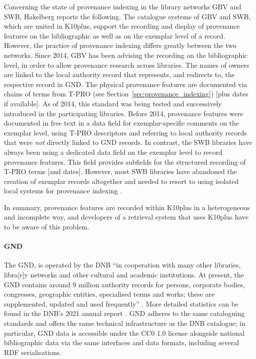 Concerning the state of provenance indexing in the library networks \gls{GBV} and \gls{SWB},
Hakelberg \autocite*[§4]{Hakelberg2016} reports the following.
The catalogue systems of \gls{GBV} and \gls{SWB}, which are united in K10plus,
support the recording and display
of provenance features on the bibliographic as well as on the exemplar level of a record.
However, the practice of provenance indexing differs greatly between the two networks.
Since 2014, GBV has been advising the recording on the bibliographic level,
in order to allow provenance research across libraries. The names of owners are linked
to the local authority record that represents, and redirects to, the respective record in \gls{GND}.
The physical provenance features are documented via chains of terms from
\gls{T-PRO} (see Section~\ref{sec:provenance_indexing}) [plus dates if available].
As of 2014,
this standard was being tested and successively introduced in the participating libraries.
Before 2014, provenance features were documented in free text in a data field for
exemplar-specific comments on the exemplar level, using \gls{T-PRO} descriptors 
and referring to local authority records that were \emph{not} directly linked to \gls{GND} records.
In contrast, the \gls{SWB} libraries have always been using a dedicated data field
on the exemplar level to record provenance features.
This field provides subfields for the structured recording of T-PRO terms [and dates].
However, most \gls{SWB} libraries have abandoned the creation of exemplar records altogether
and needed to resort to using isolated local systems for provenance indexing \autocite[cf.][]{Hakelberg2016}.

In summary, provenance features are recorded within K10plus in a heterogeneous
and incomplete way, and developers of a retrieval system that uses K10plus have to
be aware of this problem.

\paragraph{GND}

%
The \gls{GND}, is operated by the \gls{DNB}
\enquote{in cooperation with many other libraries, libra[r]y networks and other cultural and academic institutions.
At present, the GND contains around 9 million authority records for persons, corporate bodies, congresses, geographic entities, specialised terms and works; these are supplemented, updated and used frequently} \autocite{DNB_cataloguing}. More detailed statistics can be found in the DNB's
2021 annual report \autocite[p.49]{DNB_Jahresbericht_2021}.
GND adheres to the same cataloguing standards and offers the same technical infrastructure
as the DNB catalogue; in particular, GND data is accessible under the CC0 1.0 license alongside national bibliographic data
via the same interfaces and data formats, including several RDF serialisations.

